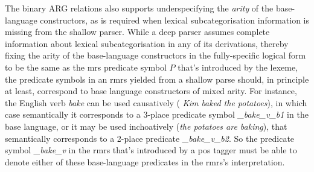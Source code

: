 The binary ARG relations also supports underspecifying the {\em arity}
of the base-language constructors, as is required when lexical
subcategorisation information is missing from the shallow parser.
While a deep parser assumes complete information about lexical
subcategorisation in any of its derivations, thereby fixing the arity
of the base-language constructors in the fully-specific logical form
to be the same as the {\sc mrs} predicate symbol $P$ that's introduced by
the lexeme, the predicate symbols in an {\sc rmrs} yielded from a
shallow parse should, in principle at least,
correspond to base language constructors of mixed arity.  For
instance, the English verb {\em bake} can be used causatively ({\em
  Kim baked the potatoes}), in which case semantically it corresponds
to a 3-place predicate symbol {\em \_bake\_v\_b1} in the base
language, or it may be used 
inchoatively ({\em the potatoes are baking}), that semantically
corresponds to a 2-place predicate {\em \_bake\_v\_b2}.  So the 
predicate symbol {\em 
  \_bake\_v} in the {\sc rmrs} that's introduced by a {\sc pos} tagger
must be able to denote either of these
base-language predicates in the {\sc rmrs}'s interpretation.



